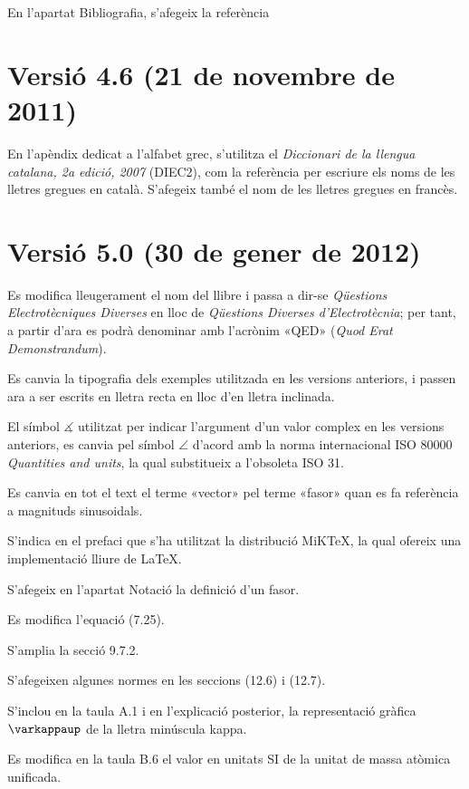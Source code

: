 En l'apartat Bibliografia, s'afegeix la referència \cite{RJB}


\section*{Versió 4.6 (21 de novembre de 2011)}

En l'apèndix dedicat a l'alfabet grec, s'utilitza el \textit{Diccionari de la llengua catalana, 2a edició, 2007} (DIEC2), com la referència per escriure els noms de les lletres gregues en català. S'afegeix també el nom de les lletres gregues en francès.


\section*{Versió 5.0 (30 de gener de 2012)}

Es modifica lleugerament el nom del llibre i  passa a dir-se \textit{Qüestions Electrotècniques Diverses} en lloc de \textit{Qüestions Diverses d'Electrotècnia}; per tant, a partir d'ara es podrà denominar amb l'acrònim «QED» (\emph{Quod Erat Demonstrandum}).

Es canvia la tipografia dels exemples utilitzada en les versions anteriors, i passen ara a ser escrits en lletra recta en lloc d'en lletra inclinada.

El símbol $\measuredangle$ utilitzat per indicar l'argument d'un valor complex en les versions anteriors, es canvia pel símbol $\angle$ d'acord amb la norma internacional ISO 80000 \textit{Quantities and units}, la qual substitueix a l'obsoleta ISO 31.

Es canvia en tot el text el terme «vector» pel terme «fasor» quan es fa referència a magnituds sinusoidals.

S'indica en el prefaci que s'ha utilitzat la distribució MiK\TeX, la qual ofereix una implementació lliure de \LaTeX.

S'afegeix en l'apartat Notació la definició d'un fasor.

Es modifica l'equació (7.25).

S'amplia la secció 9.7.2.

S'afegeixen algunes normes en les seccions (12.6) i (12.7).

S'inclou en la taula A.1 i en l'explicació posterior, la representació gràfica $\varkappaup$ de la lletra minúscula kappa.

Es modifica en la taula B.6 el valor en unitats SI de la unitat de massa atòmica unificada.

